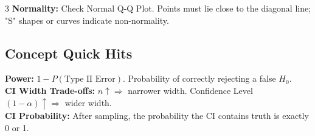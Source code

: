 \documentclass[10pt]{article}
\begin{document}
\begin{multicols}{3}
\textbf{Normality:} Check Normal Q-Q Plot. Points must lie close to the diagonal line; "S" shapes or curves indicate non-normality.

\subsection*{Concept Quick Hits}
\textbf{Power:} $1 - P(\text{Type II Error})$. Probability of correctly rejecting a false $H_0$.\\
\textbf{CI Width Trade-offs:} $n \uparrow \Rightarrow$ narrower width. Confidence Level $(1-\alpha) \uparrow \Rightarrow$ wider width.\\
\textbf{CI Probability:} After sampling, the probability the CI contains truth is exactly 0 or 1.
\end{multicols}
\end{document}
